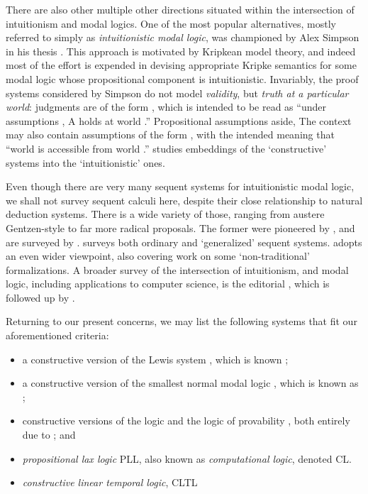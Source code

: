 \documentclass[a4paper]{amsart}
\begin{document}
There are also other multiple other directions situated within the
intersection of intuitionism and modal logics.  One of the most
popular alternatives, mostly referred to simply as
\emph{intuitionistic modal logic}, was championed by Alex Simpson
in his thesis \citep{Simpson1994}. This approach is motivated by
Kripkean model theory, and indeed most of the effort is expended
in devising appropriate Kripke semantics for some modal logic
whose propositional component is intuitionistic. Invariably, the
proof systems considered by Simpson do not model \emph{validity},
but \emph{truth at a particular world}: judgments are of the form
, which is intended to be read as ``under
assumptions , A holds at world .'' Propositional
assumptions aside, The context  may also contain
assumptions of the form , with the intended meaning that
``world  is accessible from world .'' \cite{Ranalter2010}
studies embeddings of the `constructive' systems into the
`intuitionistic' ones.

Even though there are very many sequent systems for intuitionistic
modal logic, we shall not survey sequent calculi here, despite
their close relationship to natural deduction systems. There is a
wide variety of those, ranging from austere Gentzen-style to
far more radical proposals. The former were pioneered by
\cite{Ohnisi1957, Ohnisi1959}, and are surveyed by \cite{Ono1998}.
\cite{Wansing2002} surveys both ordinary and `generalized' sequent
systems. \cite{Negri2011} adopts an even wider viewpoint, also
covering work on some `non-traditional' formalizations. A broader
survey of the intersection of intuitionism, and modal logic,
including applications to computer science, is the editorial
\citep{DePaiva2004}, which is followed up by \citep{Stewart2015}.

Returning to our present concerns, we may list the following
systems that fit our aforementioned criteria: \begin{itemize}
  \item a constructive version of the Lewis system , which is
  known ; 

  \item a constructive version of the smallest
  normal modal logic , which is known as ;

  \item constructive versions of the logic  and the
  logic of provability , both entirely due to
  \cite{Bellin1985}; and

  \item \emph{propositional lax logic} \textsf{PLL},
  also known as \emph{computational logic}, denoted \textsf{CL}.

  \item \emph{constructive linear temporal logic}, \textsf{CLTL}
\end{itemize} 
\end{document}
